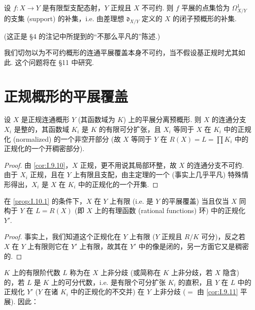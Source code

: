 \begin{corollary}\label{cor:I.9.12}
设 $f \colon X \to Y$ 是有限型支配态射，$Y$ 正规且 $X$ 不可约. 则 $f$ 平展的点集恰为 $\varOmega_{X/Y}^{1}$ 的支集 (support) 的补集，i.e. 由差理想 $\mathfrak{d}_{X/Y}$ 定义的 $X$ 的闭子预概形的补集.
\end{corollary}

(这正是 §4 的注记中所提到的``不那么平凡的''陈述.)

\begin{remarkstar}
我们切勿以为不可约概形的连通平展覆盖本身不可约，当不假设基正规时尤其如此. 这个问题将在 §11 中研究.
\end{remarkstar}

\section{正规概形的平展覆盖}

\begin{proposition}\label{prop:I.10.1}
设 $X$ 是正规连通概形 $Y$ (其函数域为 $K$) 上的平展分离预概形. 则 $X$ 的连通分支 $X_i$ 是整的，其函数域 $K_i$ 是 $K$ 的有限可分扩张，且 $X_i$ 等同于 $X$ 在 $K_i$ 中的正规化 (normalized) 的一个非空开部分 (故 $X$ 等同于 $Y$ 在 $R(X) = L = \prod K_i$ 中的正规化的一个开稠密部分).
\end{proposition}

\begin{proof}
由 \ref{cor:I.9.10}，$X$ 正规，更不用说其局部环整，故 $X$ 的连通分支不可约. 由于 $X_i$ 正规，且在 $Y$ 上有限且支配，由主定理的一个 (事实上几乎平凡) 特殊情形得出，$X_i$ 是 $X$ 在 $K_i$ 中的正规化的一个开集.
\end{proof}

\begin{corollary}\label{cor:I.10.2}
在 \ref{prop:I.10.1} 的条件下，$X$ 在 $Y$ 上有限 (i.e. 是 $Y$ 的平展覆盖) 当且仅当 $X$ 同构于 $Y$ 在 $L = R(X)$ (即 $X$ 上的有理函数 (rational functions) 环) 中的正规化 $Y'$.
\end{corollary}

\begin{proof}
事实上，我们知道这个正规化在 $Y$ 上有限 ($Y$ 正规且 $R/K$ 可分)，反之若 $X$ 在 $Y$ 上有限则它在 $Y'$ 上有限，故其在 $Y'$ 中的像是闭的，另一方面它又是稠密的.
\end{proof}

$K$ 上的有限阶代数 $L$ 称为在 $X$ 上非分歧 (或简称在 $K$ 上非分歧，若 $X$ 隐含) 的，若 $L$ 是 $K$ 上的可分代数，i.e. 是有限个可分扩张 $K_i$ 的直积，且 $Y$ 在 $L$ 中的正规化 $Y'$ ($Y$ 在诸 $K_i$ 中的正规化的不交并) 在 $Y$ 上非分歧 ($=$ 由 \ref{cor:I.9.11} 平展). 因此：

